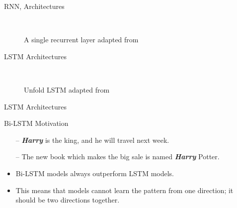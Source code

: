 \begin{frame}[fragile]{RNN, Architectures}
\begin{figure}[t]

\endminipage\hfill
{}

\endminipage\hfill
{}%

\endminipage
\caption{A single recurrent layer adapted from~\cite{colah}}~\label{Fig:LSTM_SimpleRNN}
\end{figure}%
\end{frame}


\begin{frame}[fragile]{LSTM Architectures}
\begin{figure}[t]

\endminipage\hfill
{}

\endminipage\hfill
{}%

\endminipage
\caption{Unfold LSTM adapted from~\cite{colah}}
~\label{Fig:LSTM_Cell_Chaining}
\end{figure}%
\end{frame}


\begin{frame}[fragile]{LSTM Architectures}
\begin{block}{Bi-LSTM Motivation}
\begin{itemize}
\item[--] \textit{\textbf{Harry}} is the king, and he will travel next week.
\item[--] The new book which makes the big sale is named \textit{\textbf{Harry}} Potter.
\end{itemize}
\end{block}

\begin{itemize}
\item Bi-LSTM models always outperform LSTM models.
\item This means that models cannot learn the pattern from one direction; it
should be two directions together.
\end{itemize}
\end{frame}


